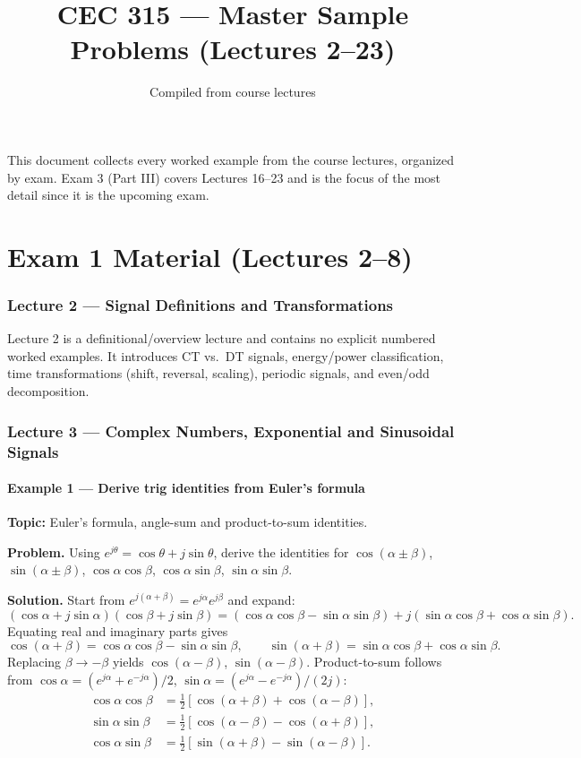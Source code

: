 \documentclass[11pt]{article}
\title{CEC 315 --- Master Sample Problems (Lectures 2--23)}
\author{Compiled from course lectures}
\date{}
\begin{document}
\maketitle

\tableofcontents
\newpage

\noindent This document collects every worked example from the course lectures,
organized by exam. Exam 3 (Part III) covers Lectures 16--23 and is the focus of
the most detail since it is the upcoming exam.

\part{Exam 1 Material (Lectures 2--8)}

\section{Lecture 2 --- Signal Definitions and Transformations}
Lecture 2 is a definitional/overview lecture and contains no explicit numbered worked examples. It introduces CT vs.\ DT signals, energy/power classification, time transformations (shift, reversal, scaling), periodic signals, and even/odd decomposition.

\section{Lecture 3 --- Complex Numbers, Exponential and Sinusoidal Signals}

\subsection{Example 1 --- Derive trig identities from Euler's formula}
\textbf{Topic:} Euler's formula, angle-sum and product-to-sum identities.

\textbf{Problem.} Using $e^{j\theta}=\cos\theta+j\sin\theta$, derive the identities for $\cos(\alpha\pm\beta)$, $\sin(\alpha\pm\beta)$, $\cos\alpha\cos\beta$, $\cos\alpha\sin\beta$, $\sin\alpha\sin\beta$.

\textbf{Solution.} Start from $e^{j(\alpha+\beta)}=e^{j\alpha}e^{j\beta}$ and expand:
\[(\cos\alpha+j\sin\alpha)(\cos\beta+j\sin\beta)=(\cos\alpha\cos\beta-\sin\alpha\sin\beta)+j(\sin\alpha\cos\beta+\cos\alpha\sin\beta).\]
Equating real and imaginary parts gives
\[\cos(\alpha+\beta)=\cos\alpha\cos\beta-\sin\alpha\sin\beta,\qquad\sin(\alpha+\beta)=\sin\alpha\cos\beta+\cos\alpha\sin\beta.\]
Replacing $\beta\to-\beta$ yields $\cos(\alpha-\beta)$, $\sin(\alpha-\beta)$. Product-to-sum follows from $\cos\alpha=(e^{j\alpha}+e^{-j\alpha})/2$, $\sin\alpha=(e^{j\alpha}-e^{-j\alpha})/(2j)$:
\begin{align*}
\cos\alpha\cos\beta&=\tfrac12[\cos(\alpha+\beta)+\cos(\alpha-\beta)],\\
\sin\alpha\sin\beta&=\tfrac12[\cos(\alpha-\beta)-\cos(\alpha+\beta)],\\
\cos\alpha\sin\beta&=\tfrac12[\sin(\alpha+\beta)-\sin(\alpha-\beta)].
\end{align*}
\end{document}
